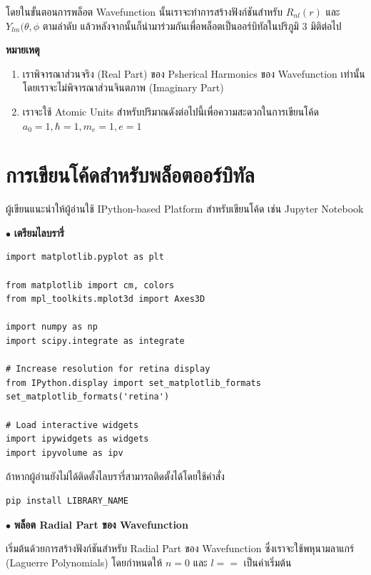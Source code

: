 โดยในขั้นตอนการพล็อต Wavefunction นั้นเราจะทำการสร้างฟังก์ชันสำหรับ $R_{nl}(r)$ และ $Y_{lm}(\theta, \phi$ ตามลำดับ แล้วหลังจากนั้นก็นำมาร่วมกันเพื่อพล็อตเป็นออร์บิทัลในปริภูมิ 3 มิติต่อไป

\noindent \textbf{หมายเหตุ} 
\begin{enumerate}[topsep=0pt,noitemsep]
    \item เราพิจารณาส่วนจริง (Real Part) ของ Psherical Harmonics ของ Wavefunction เท่านั้น โดยเราจะไม่พิจารณาส่วนจินตภาพ (Imaginary Part)

    \item เราจะใช้ Atomic Units สำหรับปริมาณดังต่อไปนี้เพื่อความสะดวกในการเขียนโค้ด $a_0=1, \hbar=1, m_e=1, e=1$
\end{enumerate}

\section{การเขียนโค้ดสำหรับพล็อตออร์บิทัล}
\label{sec:code_hydro_wfn}

ผู้เขียนแนะนำให้ผู้อ่านใช้ IPython-based Platform สำหรับเขียนโค้ด เช่น Jupyter Notebook

\bigskip

$\bullet$ \textbf{เตรียมไลบรารี่}

\begin{lstlisting}[style=MyPython]
%matplotlib inline
import matplotlib.pyplot as plt

from matplotlib import cm, colors
from mpl_toolkits.mplot3d import Axes3D

import numpy as np
import scipy.integrate as integrate

# Increase resolution for retina display
from IPython.display import set_matplotlib_formats
set_matplotlib_formats('retina')

# Load interactive widgets
import ipywidgets as widgets
import ipyvolume as ipv
\end{lstlisting}

\noindent ถ้าหากผู้อ่านยังไม่ได้ติดตั้งไลบรารี่สามารถติดตั้งได้โดยใช้คำสั่ง

\begin{lstlisting}[style=MyBash]
pip install LIBRARY_NAME
\end{lstlisting}

\bigskip

$\bullet$ \textbf{พล็อต Radial Part ของ Wavefunction}

เริ่มต้นด้วยการสร้างฟังก์ชันสำหรับ Radial Part ของ Wavefunction ซึ่งเราจะใช้พหุนามลาแกร์ (Laguerre Polynomials) โดยกำหนดให้ $n = 0$ และ $l = =$ เป็นค่าเริ่มต้น

